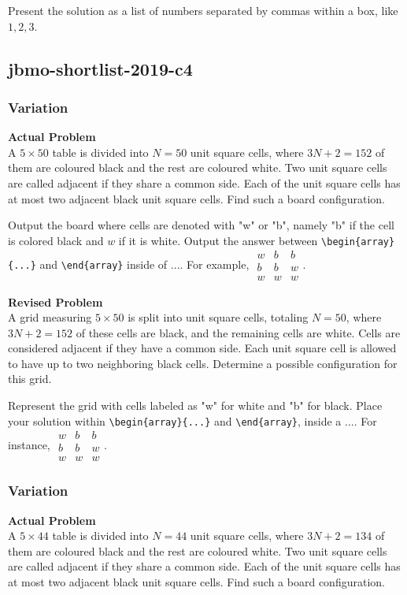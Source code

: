 Present the solution as a list of numbers separated by commas within a box, like \(\boxed{1, 2, 3}\).

\subsection{jbmo-shortlist-2019-c4}
\subsubsection{Variation}
\textbf{Actual Problem}\\
A $5 \times 50$ table is divided into $N=50$ unit square cells, where $3N+2=152$ of them are coloured black and the rest are coloured white. Two unit square cells are called adjacent if they share a common side. Each of the unit square cells has at most two adjacent black unit square cells. Find such a board configuration.

Output the board where cells are denoted with "w" or "b", namely "b" if the cell is colored black and $w$ if it is white. Output the answer between \verb|\begin{array}{...}| and \verb|\end{array}| inside of $\boxed{...}$. For example, $\boxed{\begin{array}{ccc}w & b & b \\ b & b & w \\ w & w & w\end{array}}$.

\textbf{Revised Problem}\\
A grid measuring $5 \times 50$ is split into unit square cells, totaling $N=50$, where $3N+2=152$ of these cells are black, and the remaining cells are white. Cells are considered adjacent if they have a common side. Each unit square cell is allowed to have up to two neighboring black cells. Determine a possible configuration for this grid.

Represent the grid with cells labeled as "w" for white and "b" for black. Place your solution within \verb|\begin{array}{...}| and \verb|\end{array}|, inside a $\boxed{...}$. For instance, $\boxed{\begin{array}{ccc}w & b & b \\ b & b & w \\ w & w & w\end{array}}$.

\subsubsection{Variation}
\textbf{Actual Problem}\\
A $5 \times 44$ table is divided into $N=44$ unit square cells, where $3N+2=134$ of them are coloured black and the rest are coloured white. Two unit square cells are called adjacent if they share a common side. Each of the unit square cells has at most two adjacent black unit square cells. Find such a board configuration.

